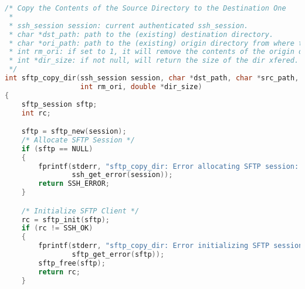 \begin{lstlisting}[language=C,caption={Signature and schematic implementation of remote execution methods.\label{code:libssh}}]
/* Copy the Contents of the Source Directory to the Destination One 
 *
 * ssh_session session: current authenticated ssh_session.
 * char *dst_path: path to the (existing) destination directory.
 * char *ori_path: path to the (existing) origin directory from where to copy.
 * int rm_ori: if set to 1, it will remove the contents of the origin directory.
 * int *dir_size: if not null, will return the size of the dir xfered.
 */
int sftp_copy_dir(ssh_session session, char *dst_path, char *src_path,
                  int rm_ori, double *dir_size)
{
    sftp_session sftp;
    int rc;

    sftp = sftp_new(session);
    /* Allocate SFTP Session */
    if (sftp == NULL)
    {
        fprintf(stderr, "sftp_copy_dir: Error allocating SFTP session: %s\n",
                ssh_get_error(session));
        return SSH_ERROR;
    }

    /* Initialize SFTP Client */
    rc = sftp_init(sftp);
    if (rc != SSH_OK)
    {
        fprintf(stderr, "sftp_copy_dir: Error initializing SFTP session: %d\n",
                sftp_get_error(sftp));
        sftp_free(sftp);
        return rc;
    }


\end{lstlisting}
